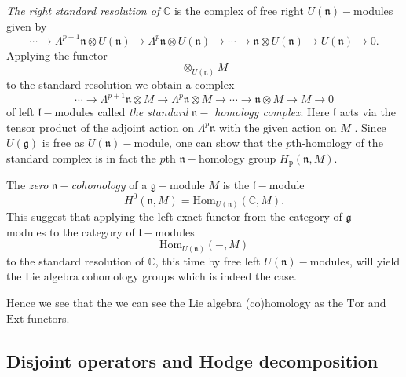 \emph{The right standard resolution of }$\mathbb{C}$ is the
complex of free right $U(\mathfrak{n})-$modules given by
\begin{equation*}
\cdots \rightarrow \Lambda ^{p+1}\mathfrak{n}\otimes U(\mathfrak{n}%
)\rightarrow \Lambda ^{p}\mathfrak{n}\otimes U(\mathfrak{n})\rightarrow
\cdots \rightarrow \mathfrak{n}\otimes U(\mathfrak{n})\rightarrow U(%
\mathfrak{n})\rightarrow 0\text{.}
\end{equation*}%
Applying the functor
\begin{equation*}
-\otimes _{U(\mathfrak{n})}M\text{ }
\end{equation*}%
to the standard resolution we obtain a complex
\begin{equation*}
\cdots \rightarrow \Lambda ^{p+1}\mathfrak{n}\otimes M\rightarrow \Lambda
^{p}\mathfrak{n}\otimes M\rightarrow \cdots \rightarrow \mathfrak{n}\otimes
M\rightarrow M\rightarrow 0
\end{equation*}%
of left $\mathfrak{l}-$modules called \emph{the standard} $\mathfrak{n}-$%
\emph{homology complex}. Here $\mathfrak{l}$ acts via the tensor product of
the adjoint action on $\Lambda ^{p}\mathfrak{n}$ with the given action on $M$%
. Since $U(\mathfrak{g})$ is free as $U(\mathfrak{n})-$module, one can show that the $p$th-homology of the standard complex is in fact the $p$th $\mathfrak{n}-$homology group $H_{\text{p}}(\mathfrak{n},M).$

The \emph{zero} $\mathfrak{n}-$\emph{cohomology }of a $\mathfrak{g}%
-$module $M$ is the $\mathfrak{l}-$module
\begin{equation*}
H^{0}(\mathfrak{n},M)=\text{Hom}_{U(\mathfrak{n})}(\mathbb{C},M).
\end{equation*}%
This suggest that applying the left exact functor from the category of $\mathfrak{g}-$%
modules to the category of $\mathfrak{l}-$modules
\begin{equation*}
\text{Hom}_{U(\mathfrak{n})}(-,M)
\end{equation*}%
to the standard resolution of $\mathbb{C}$, this time by free left $U(%
\mathfrak{n})-$modules, will yield the Lie algebra cohomology groups which is indeed the case. 

Hence we see that the we can see the Lie algebra (co)homology as the $\mathrm{Tor}$ and $\mathrm{Ext}$ functors.

\subsection{Disjoint operators and Hodge decomposition}

